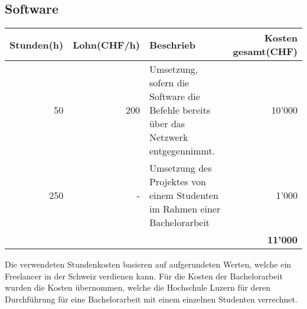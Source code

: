 \subsection{Software}
\label{ssec:SoftwareKosten}
\begin{tabularx}{\textwidth}{|r|r|X|r|}
	\hline
	\textbf{Stunden(h)} & \textbf{Lohn(CHF/h)} & \textbf{Beschrieb} & \textbf{Kosten gesamt(CHF)} \\
	\hline
	50 & 200 & Umsetzung, sofern die Software die Befehle bereits über das Netzwerk entgegennimmt. & 10'000 \\
	\hline
	250 & - & Umsetzung des Projektes von einem Studenten im Rahmen einer Bachelorarbeit & 1'000 \\
	& & & \textbf{11'000} \\
	\hline
\end{tabularx}

Die verwendeten Stundenkosten basieren auf aufgerundeten Werten, welche ein Freelancer in der Schweiz verdienen kann.
Für die Kosten der Bachelorarbeit wurden die Kosten übernommen, welche die Hochschule Luzern für deren Durchführung für eine Bachelorarbeit mit einem einzelnen Studenten verrechnet.
